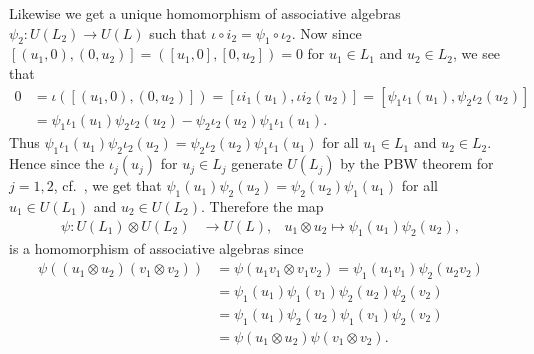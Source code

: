 Likewise we get a unique homomorphism of associative algebras $\psi_2\colon U(L_2)\to U(L)$ such that $\iota\circ i_2 = \psi_1\circ \iota_2$. Now since $[(u_1,0),(0,u_2)]=([u_1,0],[0,u_2])=0$ for $u_1\in L_1$ and $u_2\in L_2$, we see that
\begin{align*}
  0 &= \iota([(u_1,0),(0,u_2)]) = [\iota i_1(u_1),\iota i_2(u_2)] = [\psi_1 \iota_1(u_1),\psi_2 \iota_2(u_2)] \\
  &= \psi_1\iota_1(u_1)\psi_2\iota_2(u_2) - \psi_2\iota_2(u_2)\psi_1\iota_1(u_1).
\end{align*}
Thus $\psi_1\iota_1(u_1)\psi_2\iota_2(u_2)=\psi_2\iota_2(u_2)\psi_1\iota_1(u_1)$ for all $u_1\in L_1$ and $u_2\in L_2$. Hence since the $\iota_j(u_j)$ for $u_j\in L_j$ generate $U(L_j)$ by the PBW theorem for $j=1,2$, cf.\ \cite[p.~E-7]{jantzen}, we get that $\psi_1(u_1)\psi_2(u_2)=\psi_2(u_2)\psi_1(u_1)$ for all $u_1\in U(L_1)$ and $u_2\in U(L_2)$. Therefore the map
\begin{align*}
  \psi\colon U(L_1)\otimes U(L_2)&\to U(L), & u_1\otimes u_2\mapsto \psi_1(u_1)\psi_2(u_2),
\end{align*}
is a homomorphism of associative algebras since
\begin{align*}
  \psi((u_1\otimes u_2)(v_1\otimes v_2)) &= \psi(u_1v_1\otimes v_1v_2) = \psi_1(u_1v_1)\psi_2(u_2v_2)\\
                                        &= \psi_1(u_1)\psi_1(v_1)\psi_2(u_2)\psi_2(v_2)\\
                                        &= \psi_1(u_1)\psi_2(u_2)\psi_1(v_1)\psi_2(v_2)\\
                                        &= \psi(u_1\otimes u_2)\psi(v_1\otimes v_2).
\end{align*}

